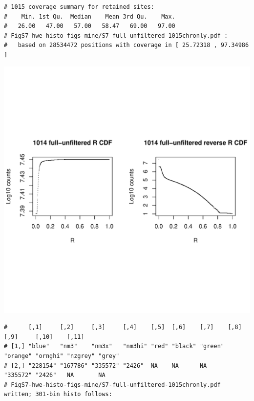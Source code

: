 \documentclass{article}\usepackage[]{graphicx}\usepackage[]{color}
\makeatletter
\def\maxwidth{ %
  \ifdim\Gin@nat@width>\linewidth
    \linewidth
  \else
    \Gin@nat@width
  \fi
}
\newenvironment{kframe}{%
 \def\at@end@of@kframe{}%
 \ifinner\ifhmode%
  \def\at@end@of@kframe{\end{minipage}}%
  \begin{minipage}{\columnwidth}%
 \fi\fi%
 \def\FrameCommand##1{\hskip\@totalleftmargin \hskip-\fboxsep
 \colorbox{shadecolor}{##1}\hskip-\fboxsep
     \hskip-\linewidth \hskip-\@totalleftmargin \hskip\columnwidth}%
 \MakeFramed {\advance\hsize-\width
   \@totalleftmargin\z@ \linewidth\hsize
   \@setminipage}}%
 {\par\unskip\endMakeFramed%
 \at@end@of@kframe}
\newenvironment{knitrout}{}{} %
\makeatother
\begin{document}
\begin{knitrout}
\begin{kframe}
\begin{verbatim}
# 1015 coverage summary for retained sites:
#    Min. 1st Qu.  Median    Mean 3rd Qu.    Max. 
#   26.00   47.00   57.00   58.47   69.00   97.00 
# FigS7-hwe-histo-figs-mine/S7-full-unfiltered-1015chronly.pdf :
#   based on 28534472 positions with coverage in [ 25.72318 , 97.34986 ]
\end{verbatim}
\end{kframe}
\includegraphics[width=\maxwidth]{FigS7-hwe-histo-figs-knitr/unnamed-chunk-10-8} 
\begin{kframe}\begin{verbatim}
#      [,1]     [,2]     [,3]     [,4]    [,5]  [,6]    [,7]    [,8]     [,9]     [,10]    [,11] 
# [1,] "blue"   "nm3"    "nm3x"   "nm3hi" "red" "black" "green" "orange" "ornghi" "nzgrey" "grey"
# [2,] "228154" "167786" "335572" "2426"  NA    NA      NA      "335572" "2426"   NA       NA    
# FigS7-hwe-histo-figs-mine/S7-full-unfiltered-1015chronly.pdf written; 301-bin histo follows:
\end{verbatim}
\end{kframe}

\end{knitrout}
\end{document}
